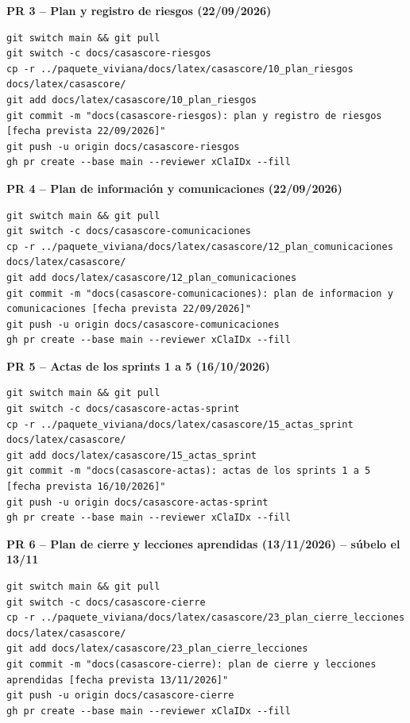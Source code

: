 \documentclass[11pt,a4paper]{article}
\begin{document}
\noindent\textbf{PR 3 -- Plan y registro de riesgos (22/09/2026)}
\begin{lstlisting}
git switch main && git pull
git switch -c docs/casascore-riesgos
cp -r ../paquete_viviana/docs/latex/casascore/10_plan_riesgos docs/latex/casascore/
git add docs/latex/casascore/10_plan_riesgos
git commit -m "docs(casascore-riesgos): plan y registro de riesgos [fecha prevista 22/09/2026]"
git push -u origin docs/casascore-riesgos
gh pr create --base main --reviewer xClaIDx --fill
\end{lstlisting}

\noindent\textbf{PR 4 -- Plan de información y comunicaciones (22/09/2026)}
\begin{lstlisting}
git switch main && git pull
git switch -c docs/casascore-comunicaciones
cp -r ../paquete_viviana/docs/latex/casascore/12_plan_comunicaciones docs/latex/casascore/
git add docs/latex/casascore/12_plan_comunicaciones
git commit -m "docs(casascore-comunicaciones): plan de informacion y comunicaciones [fecha prevista 22/09/2026]"
git push -u origin docs/casascore-comunicaciones
gh pr create --base main --reviewer xClaIDx --fill
\end{lstlisting}

\noindent\textbf{PR 5 -- Actas de los sprints 1 a 5 (16/10/2026)}
\begin{lstlisting}
git switch main && git pull
git switch -c docs/casascore-actas-sprint
cp -r ../paquete_viviana/docs/latex/casascore/15_actas_sprint docs/latex/casascore/
git add docs/latex/casascore/15_actas_sprint
git commit -m "docs(casascore-actas): actas de los sprints 1 a 5 [fecha prevista 16/10/2026]"
git push -u origin docs/casascore-actas-sprint
gh pr create --base main --reviewer xClaIDx --fill
\end{lstlisting}

\noindent\textbf{PR 6 -- Plan de cierre y lecciones aprendidas (13/11/2026) -- súbelo el 13/11}
\begin{lstlisting}
git switch main && git pull
git switch -c docs/casascore-cierre
cp -r ../paquete_viviana/docs/latex/casascore/23_plan_cierre_lecciones docs/latex/casascore/
git add docs/latex/casascore/23_plan_cierre_lecciones
git commit -m "docs(casascore-cierre): plan de cierre y lecciones aprendidas [fecha prevista 13/11/2026]"
git push -u origin docs/casascore-cierre
gh pr create --base main --reviewer xClaIDx --fill
\end{lstlisting}
\end{document}
